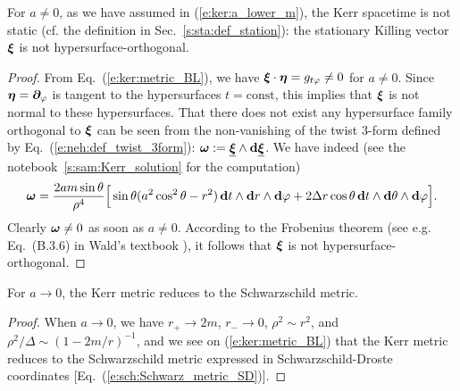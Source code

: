 \begin{prop}
For $a\neq 0$, as we have assumed in (\ref{e:ker:a_lower_m}), the
Kerr spacetime is not static (cf. the definition in Sec.~\ref{s:sta:def_station}):
the stationary Killing vector $\bm{\xi}$ is not hypersurface-orthogonal.
\end{prop}

\begin{proof}
From Eq.~(\ref{e:ker:metric_BL}), we have
$\bm{\xi}\cdot\bm{\eta} = g_{t\varphi} \neq 0$ for $a\neq 0$.
Since $\bm{\eta}=\bm{\partial}_\varphi$ is tangent to the hypersurfaces $t=\mathrm{const}$, this implies
that $\bm{\xi}$ is not normal to these hypersurfaces.
That there does not exist any hypersurface
family orthogonal to $\bm{\xi}$ can be seen from the non-vanishing of the twist 3-form defined by Eq.~(\ref{e:neh:def_twist_3form}):
$\bm{\omega} := \underline{\bm{\xi}}\wedge \mathbf{d}\underline{\bm{\xi}}$. We have indeed (see the notebook~\ref{s:sam:Kerr_solution} for the computation)
\[
    \bm{\omega} = \frac{2 a m \sin\theta}{\rho^4} \Big[
        \sin\theta (a^2\cos^2\theta - r^2) \, \mathbf{d} t \wedge \mathbf{d} r \wedge \mathbf{d} \varphi
        + 2 \Delta r \cos\theta \, \mathbf{d} t \wedge \mathbf{d} \theta \wedge \mathbf{d} \varphi \Big] .
\]
Clearly $\bm{\omega} \neq 0$ as soon as $a\neq 0$. According to the
Frobenius theorem (see e.g.
Eq.~(B.3.6) in Wald's textbook \cite{Wald84}), it follows that
$\bm{\xi}$ is not hypersurface-orthogonal.
\end{proof}

\begin{prop}
For $a\to 0$, the Kerr metric reduces to the Schwarzschild metric.
\end{prop}

\begin{proof}
When $a\rightarrow 0$, we have $r_+\rightarrow 2m$, $r_-\rightarrow 0$,
$\rho^2\sim r^2$, and $\rho^2/\Delta \sim (1-2m/r)^{-1}$, and we see on
(\ref{e:ker:metric_BL}) that the Kerr metric reduces to the Schwarzschild metric
expressed
in Schwarzschild-Droste coordinates [Eq.~(\ref{e:sch:Schwarz_metric_SD})].
\end{proof}

